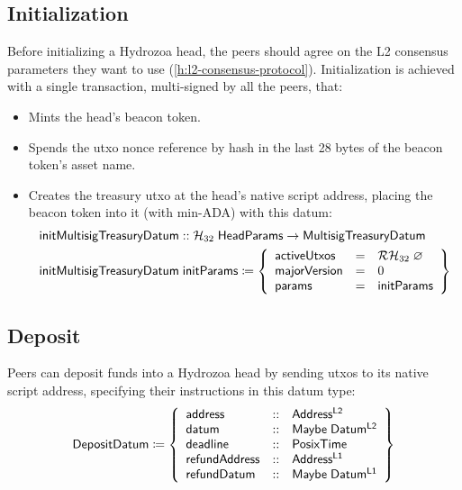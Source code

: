 \documentclass[../hydrozoa.tex]{subfiles}
\begin{document}
\subsection{Initialization}%
\label{h:multisig-init}
Before initializing a Hydrozoa head, the peers should agree on the L2 consensus parameters they want to use (\cref{h:l2-consensus-protocol}).
Initialization is achieved with a single transaction, multi-signed by all the peers, that:
\begin{itemize}
  \item Mints the head's beacon token.
  \item Spends the utxo nonce reference by hash in the last 28 bytes of the beacon token's asset name.
  \item Creates the treasury utxo at the head's native script address, placing the beacon token into it (with min-ADA) with this datum:
    \begin{equation*}
    \begin{split}
      \mathsf{initMultisigTreasuryDatum} &:: \mathcal{H}_{32} \; \mathsf{HeadParams} -> \mathsf{MultisigTreasuryDatum} \\
      \mathsf{initMultisigTreasuryDatum} &\; \mathsf{initParams} \coloneq \left\{
        \begin{array}{lll}
          \mathsf{activeUtxos} &=& \mathcal{RH}_{32} \; \varnothing \\
          \mathsf{majorVersion} &=& 0 \\
          \mathsf{params} &=& \mathsf{initParams}
        \end{array}\right\}
    \end{split}
    \end{equation*}
\end{itemize}

\subsection{Deposit}%
\label{h:multisig-deposit}
Peers can deposit funds into a Hydrozoa head by sending utxos to its native script address, specifying their instructions in this datum type:
\begin{equation*}
  \mathsf{DepositDatum} \coloneq \left\{
  \begin{array}{lll}
    \mathsf{address} &::& \mathsf{Address^{L2}} \\
    \mathsf{datum} &::& \mathsf{Maybe \; Datum^{L2}} \\
    \mathsf{deadline} &::& \mathsf{PosixTime} \\
    \mathsf{refundAddress} &::& \mathsf{Address^{L1}} \\
    \mathsf{refundDatum} &::& \mathsf{Maybe \; Datum^{L1}}
  \end{array}\right\}
\end{equation*}
\end{document}

